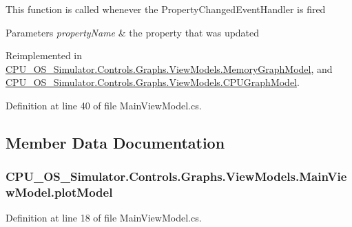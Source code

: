 This function is called whenever the Property\+Changed\+Event\+Handler is fired 


\begin{DoxyParams}{Parameters}
{\em property\+Name} & the property that was updated\\
\hline
\end{DoxyParams}


Reimplemented in \hyperlink{class_c_p_u___o_s___simulator_1_1_controls_1_1_graphs_1_1_view_models_1_1_memory_graph_model_a082e3a05bc7db863c211c8a47cb50959}{C\+P\+U\+\_\+\+O\+S\+\_\+\+Simulator.\+Controls.\+Graphs.\+View\+Models.\+Memory\+Graph\+Model}, and \hyperlink{class_c_p_u___o_s___simulator_1_1_controls_1_1_graphs_1_1_view_models_1_1_c_p_u_graph_model_a52080a7db1449fa25e2f8d268a7e8ae2}{C\+P\+U\+\_\+\+O\+S\+\_\+\+Simulator.\+Controls.\+Graphs.\+View\+Models.\+C\+P\+U\+Graph\+Model}.



Definition at line 40 of file Main\+View\+Model.\+cs.



\subsection{Member Data Documentation}
\hypertarget{class_c_p_u___o_s___simulator_1_1_controls_1_1_graphs_1_1_view_models_1_1_main_view_model_a60f5d0ec4f657348fdfbd836bda9249c}{}
\subsubsection[{plot\+Model}]{ C\+P\+U\+\_\+\+O\+S\+\_\+\+Simulator.\+Controls.\+Graphs.\+View\+Models.\+Main\+View\+Model.\+plot\+Model\hspace{0.3cm}{\ttfamily [private]}}\label{class_c_p_u___o_s___simulator_1_1_controls_1_1_graphs_1_1_view_models_1_1_main_view_model_a60f5d0ec4f657348fdfbd836bda9249c}


Definition at line 18 of file Main\+View\+Model.\+cs.



